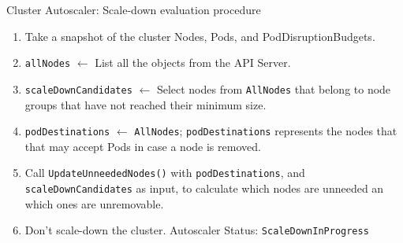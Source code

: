 \begin{algorithm}[H]
    \caption{Cluster Autoscaler: Scale-down evaluation procedure}\label{alg:scale-down-evaluation}
    \begin{enumerate}[leftmargin=0cm]
        \tightlist
        \item Take a snapshot of the cluster Nodes, Pods, and PodDisruptionBudgets.
        \item \texttt{allNodes} \(\leftarrow\) List all the  objects from the API Server.
        \item \texttt{scaleDownCandidates} \(\leftarrow\) Select nodes from
              \texttt{AllNodes} that belong to node groups that have not reached their
              minimum size.
        \item \texttt{podDestinations} \(\leftarrow\) \texttt{AllNodes};
              \texttt{podDestinations} represents the nodes that that may accept Pods in case a node is removed.
        \item Call \texttt{UpdateUnneededNodes()} with \texttt{podDestinations},
              and \texttt{scaleDownCandidates} as input, to calculate which nodes are
              unneeded an which ones are unremovable.
        \item {}
               {
                  Don't scale-down the cluster. Autoscaler Status: \texttt{ScaleDownInProgress}}
    \end{enumerate}
\end{algorithm}

